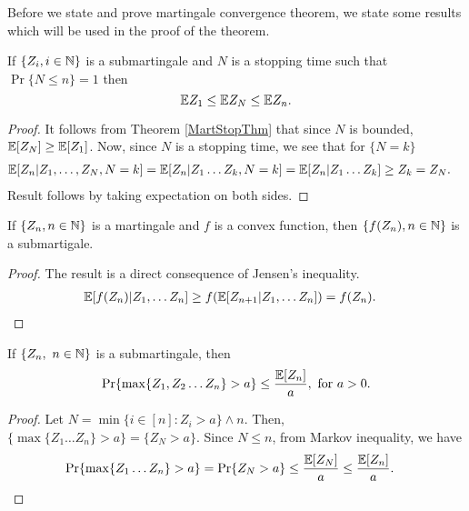 \documentclass[a4paper,10pt,english]{article}
\begin{document}
Before we state and prove martingale convergence theorem, we state some results which will be used in the proof of the theorem.
\begin{lem}
\label{StoppingTimeBound}
If $\{Z_i, i \in \mathbb{N} \}$ is  a submartingale and $N$ is a stopping time such that $\Pr\{N \leq n\}=1$ then
\begin{equation*}
 \mathbb{E} Z_1 \leq \mathbb{E} Z_N \leq \mathbb{E} Z_n.
\end{equation*}
\end{lem}
\begin{proof}
It follows from Theorem \ref{MartStopThm} that since $N$ is bounded, $\mathbb{E}[Z_N] \geq \mathbb{E}[Z_1]$. Now, since $N$ is a stopping time, we see that for $\{N = k\}$
\begin{eqnarray*}
\mathbb{E}[Z_n|Z_1, \hdots ,Z_N,N=k]&=\mathbb{E}[Z_n|Z_1 \hdots Z_k,N=k] = \mathbb{E}[Z_n|Z_1 \hdots Z_k] \geq Z_k = Z_N.
\end{eqnarray*}
Result follows by taking expectation on both sides.
\end{proof}
\begin{lem}
\label{ConvexFuncSubmart}
If $\{Z_n,n \in \mathbb{N}\}$ is a martingale and $f$ is a convex function, then $\{f(Z_n),n \in \mathbb{N}\}$ is a submartigale.
\end{lem}
\begin{proof}
The result is a direct consequence of Jensen's inequality.
\begin{align*}
\mathbb{E}[f(Z_n)|Z_1, \hdots Z_n] &\geq f(\mathbb{E}[Z_{n+1}|Z_1, \hdots Z_n])=f(Z_n).
\end{align*}
\end{proof}
\begin{thm} If $\{Z_n,~ n \in \mathbb{N} \}$ is a submartingale, then
\begin{equation*}
\Pr\{\max\{Z_1,Z_2 \hdots Z_n\}>a\}\leq \frac{\mathbb{E}[Z_n]}{a},~ \text{for}~ a>0.
\end{equation*}
\end{thm}
\begin{proof}
Let $N = \min\{i \in [n]: Z_i >a\} \wedge n$. %
Then, $\{\max\{Z_1 \hdots Z_n\}>a\} = \{Z_N > a\}$. Since $N \leq n$, from Markov inequality, we have
\begin{align*}
\Pr\{\max\{Z_1 \hdots Z_n\}>a\}&=\Pr\{Z_N>a\} \leq \frac{\mathbb{E}[Z_N]}{a} \leq  \frac{\mathbb{E}[Z_n]}{a}.
\end{align*}
\end{proof}
\end{document}
